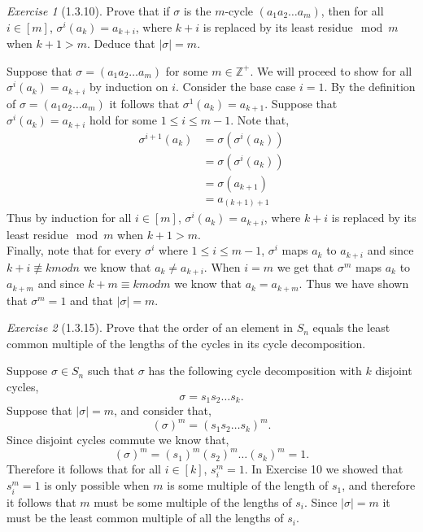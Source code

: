 \documentclass[12pt]{amsart}
\makeatletter
\theoremstyle{remark}
\newtheorem*{exercise}{Exercise}%
\def\ZZ{\ensuremath{\mathbb Z}}
\renewenvironment{proof}[1][\proofname]{\par\doublespacing
  \pushQED{\qed}%
  \normalfont \topsep6\p@\@plus6\p@\relax
  \list{}{%
    \settowidth{\leftmargin}{\itshape\proofname:\hskip\labelsep}%
    \setlength{\labelwidth}{0pt}%
    \setlength{\itemindent}{-\leftmargin}%
  }%
  \item[\hskip\labelsep\itshape#1\@addpunct{:}]\ignorespaces
}{%
  \popQED\endlist\@endpefalse
  \singlespacing
}
\theoremstyle{mycomment}
\makeatother
\begin{document}
\begin{exercise}[1.3.10] Prove that if $\sigma$ is the $m$-cycle $(a_1 a_2 \dots a_m)$, then for all $i \in [m]$, $\sigma^i(a_k) = a_{k+i}$, 
  where $k+i$ is replaced by its least residue$\mod m$ when $k+1 > m$. Deduce that $|\sigma| = m$.
  \begin{proof} Suppose that $\sigma = (a_1 a_2 \dots a_m)$ for some $m \in \ZZ^+$. We will proceed to show for all $\sigma^i(a_k) = a_{k+i}$ by induction on $i$. 
    Consider the base case $i = 1$. By the definition of $\sigma = (a_1 a_2 \dots a_m)$ it follows that $\sigma^{1}(a_k) = a_{k+1}$. Suppose that $\sigma^i(a_k) = a_{k+i}$ hold for some 
    $1 \leq i \leq m-1$. Note that,
    \begin{align*}
      \sigma^{i+1}(a_k) &= \sigma(\sigma^{i}(a_k))\\
      &= \sigma(\sigma^{i}(a_k))\\
      &= \sigma(a_{k+1})\\
      &= a_{(k+1) + 1}
    \end{align*}
    Thus by induction for all $i \in [m]$, $\sigma^i(a_k) = a_{k+i}$, where $k+i$ is replaced by its least residue$\mod m$ when $k+1 > m$.\\
    Finally, note that for every $\sigma^i$ where $1\leq i \leq m-1$, $\sigma^i$ maps $a_k$ to $a_{k+i}$ and since $k + i \not\equiv k mod n$ we know that $a_k \neq a_{k+i}$.
    When $i = m$ we get that $\sigma^m$ maps $a_k$ to $a_{k+m}$ and since $k + m \equiv k mod m$ we know that $a_k = a_{k+m}$. Thus we have shown that $\sigma^m = 1$ and that $|\sigma| = m$. 
  \end{proof}
\end{exercise}


\begin{exercise}[1.3.15] Prove that the order of an element in $S_n$ equals the least common multiple of the lengths of the cycles in its cycle decomposition. 
  \begin{proof} Suppose $\sigma \in S_n$ such that $\sigma$ has the following cycle decomposition with $k$ disjoint cycles, 
    \begin{equation*}
      \sigma = s_1 s_2 \dots s_k. 
    \end{equation*}
    Suppose that $|\sigma| = m$, and consider that, 
    \begin{equation*}
      (\sigma)^m = (s_1 s_2 \dots s_k )^m.
    \end{equation*} 
    Since disjoint cycles commute we know that, 
    \begin{equation*}
      (\sigma)^m = (s_1)^m(s_2)^m\dots(s_k)^m = 1.
    \end{equation*}
    Therefore it follows that for all $i \in [k]$, $s_i^m = 1$. In Exercise 10 we showed that $s_i^m = 1$ is only possible when $m$ is some multiple of the length of $s_1$, and 
    therefore it follows that $m$ must be some multiple of the lengths of $s_i$. Since $|\sigma| = m$ it must be the least common multiple of all the lengths of $s_i$.
  \end{proof}
\end{exercise}
\end{document}
